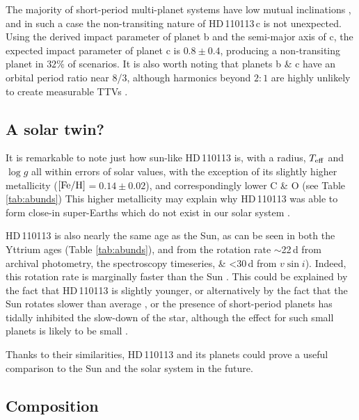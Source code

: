 \documentclass[fleqn,usenatbib]{mnras}
\newcommand{\vsini}{$v\sin{i}$}
\newcommand{\teff}{$T_{\rm eff}$}
\newcommand{\feh}{\mbox{$\rm [Fe/H]$}}
\newcommand{\logg}{$\log g$}
\newcommand{\Tstar}{HD\,110113}
\newcommand{\Tplanetc}{HD\,110113\,c}
\begin{document}
The majority of short-period multi-planet systems have low mutual inclinations \citep{lissauer2011architecture}, and in such a case the non-transiting nature of \Tplanetc{} is not unexpected.
Using the derived impact parameter of planet b and the semi-major axis of c, the expected impact parameter of planet c is $0.8\pm0.4$, producing a non-transiting planet in $32\%$ of scenarios.
It is also worth noting that planets b \& c have an orbital period ratio near 8/3, although harmonics beyond $2:1$ are highly unlikely to create measurable TTVs \citep{deck2015measurement}.

\subsection{A solar twin?}
It is remarkable to note just how sun-like \Tstar{} is, with a radius, \teff{} and \logg{} all within errors of solar values, with the exception of its slightly higher metallicity (\feh{}$ = 0.14\pm0.02$), and correspondingly lower C \& O (see Table \ref{tab:abunds}) \citep[e.g.][]{Franchini2020,2015A&A...576A..89B}
This higher metallicity may explain why \Tstar{} was able to form close-in super-Earths which do not exist in our solar system \citep{mulders2016super,bitsch2020influence}.

\Tstar{} is also nearly the same age as the Sun, as can be seen in both the Yttrium ages (Table \ref{tab:abunds}), and from the rotation rate $\sim$22\,d from archival photometry, the spectroscopy timeseries, \& <30\,d from \vsini{}).
Indeed, this rotation rate is marginally faster than the Sun \citep[25-26.5d when measured with HARPS-N and converted to sidereal period,][]{milbourne2019harps}.
This could be explained by the fact that \Tstar{} is slightly younger, or alternatively by the fact that the Sun rotates slower than average \citep{2008ApJ...684..691R}, or the presence of short-period planets has tidally inhibited the slow-down of the star, although the effect for such small planets is likely to be small \citep{bolmont2012effect}.

Thanks to their similarities, \Tstar{} and its planets could prove a useful comparison to the Sun and the solar system in the future.

\subsection{Composition}\label{sect:internal}
\end{document}

